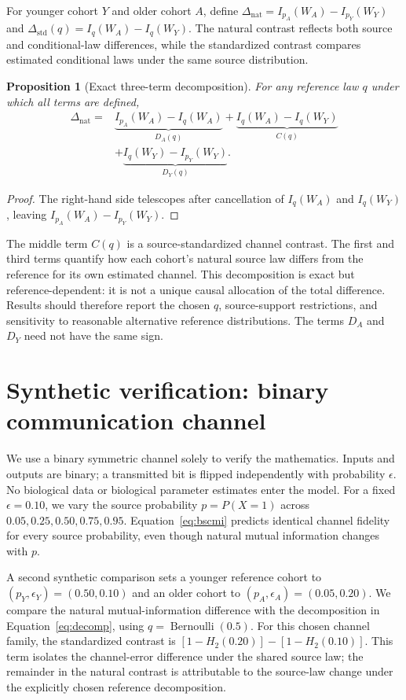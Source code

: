\documentclass[11pt]{article}
\newtheorem{proposition}{Proposition}
\begin{document}
For younger cohort $Y$ and older cohort $A$, define $\Delta_{\mathrm{nat}}=I_{p_A}(W_A)-I_{p_Y}(W_Y)$ and $\Delta_{\mathrm{std}}(q)=I_q(W_A)-I_q(W_Y)$. The natural contrast reflects both source and conditional-law differences, while the standardized contrast compares estimated conditional laws under the same source distribution.

\begin{proposition}[Exact three-term decomposition]
For any reference law $q$ under which all terms are defined,
\begin{align}
\Delta_{\mathrm{nat}}={}&\underbrace{I_{p_A}(W_A)-I_q(W_A)}_{D_A(q)}+\underbrace{I_q(W_A)-I_q(W_Y)}_{C(q)}\\
&+\underbrace{I_q(W_Y)-I_{p_Y}(W_Y)}_{D_Y(q)}.
\label{eq:decomp}
\end{align}
\end{proposition}
\begin{proof}
The right-hand side telescopes after cancellation of $I_q(W_A)$ and $I_q(W_Y)$, leaving $I_{p_A}(W_A)-I_{p_Y}(W_Y)$.\end{proof}

The middle term $C(q)$ is a source-standardized channel contrast. The first and third terms quantify how each cohort's natural source law differs from the reference for its own estimated channel. This decomposition is exact but reference-dependent: it is not a unique causal allocation of the total difference. Results should therefore report the chosen $q$, source-support restrictions, and sensitivity to reasonable alternative reference distributions. The terms $D_A$ and $D_Y$ need not have the same sign.

\section{Synthetic verification: binary communication channel}
We use a binary symmetric channel solely to verify the mathematics. Inputs and outputs are binary; a transmitted bit is flipped independently with probability $\epsilon$. No biological data or biological parameter estimates enter the model. For a fixed $\epsilon=0.10$, we vary the source probability $p=P(X=1)$ across $0.05, 0.25, 0.50, 0.75, 0.95$. Equation~\eqref{eq:bscmi} predicts identical channel fidelity for every source probability, even though natural mutual information changes with $p$.

A second synthetic comparison sets a younger reference cohort to $(p_Y,\epsilon_Y)=(0.50,0.10)$ and an older cohort to $(p_A,\epsilon_A)=(0.05,0.20)$. We compare the natural mutual-information difference with the decomposition in Equation~\eqref{eq:decomp}, using $q=\operatorname{Bernoulli}(0.5)$. For this chosen channel family, the standardized contrast is $[1-H_2(0.20)]-[1-H_2(0.10)]$. This term isolates the channel-error difference under the shared source law; the remainder in the natural contrast is attributable to the source-law change under the explicitly chosen reference decomposition.
\end{document}
